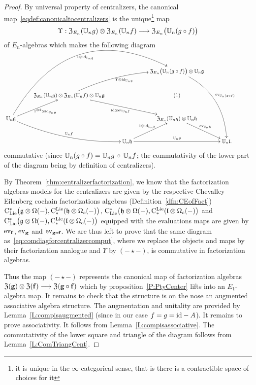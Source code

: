 \documentclass[11pt]{amsart}
\numberwithin{equation}{section}
\begin{document}
\begin{proof}
By universal property of centralizers, the canonical map~\eqref{eqdef:canonicaltocentralizers}  
is the unique\footnote{it is unique in the $\infty$-categorical 
sense, that is there is a contractible space of choices for it} map 
\[ \Upsilon: {\frak Z}_{E_n}(\mathbb U_n g) \otimes {\frak Z}_{E_n}(\mathbb U_n f) \longrightarrow {\frak Z}_{E_n}\big(\mathbb U_n (g\circ f)\big)\] 
of $E_n$-algebras which makes the following diagram
\begin{equation}\label{eq:comdiagforcentralizercomput}\small
 \xymatrix{
&   &&  
{\frak Z}_{E_n}\big(\UU_n (g\circ f) \big) \otimes  \UU_n \fg  \ar@/^{2pc}/[dddr]^{\ev_{\UU_n (g\circ f)}}\\
&{\frak Z}_{E_n}(\UU_n g) \otimes  {\frak Z}_{E_n}(\UU_n f) \otimes \UU_n \fg \ar@/^{1pc}/[rru]_{ \Upsilon \otimes \id_{\UU_n \fg}} \ar[rrd]_{\id\otimes \ev_{\UU_n f}}
&& (1)
& & \\
\UU_n \fg \ar[ur]_{1^{\otimes 2}\otimes \id_{\UU_n \fg}} \ar@/_{1pc}/[rrd]^{\UU_n f} \ar@/^{6pc}/[rrruu]_{1\otimes \id_{\UU_n \fg}} &&&
{\frak Z}_{E_n}(\UU_n g) \otimes \UU_n \fh \ar[rd]^{\ev_{\UU_n h}}  &\\
&& \UU_n \fh \ar[rr]^{\UU_n g} \ar[ur]^{1\otimes \id_{\UU_n \fh}} && \UU_n \fl .}
\end{equation}
commutative (since $\mathbb U_n (g\circ f) = \mathbb U_n g\, \circ \, \mathbb U_n f $;  the commutativity of the lower part of the diagram being by definition of centralizers).

By Theorem~\ref{thm:centralizerfactorization}, we know that the factorization algebras models for the centralizers are given by the respective Chevalley-Eilenberg cochain factorizations algebras 
(Definition~\ref{dfn:CEofFact}) ${\rm C}_{\rm Lie}^*\big(\mathfrak g \otimes \Omega(-), {\rm C}^{\rm Lie}_*(\mathfrak h \otimes \Omega_c(-)  \big) $, 
${\rm C}_{\rm Lie}^*\big(\mathfrak h \otimes \Omega(-), {\rm C}^{\rm Lie}_*(\mathfrak l \otimes \Omega_c(-)  \big) $ and ${\rm C}_{\rm Lie}^*\big(\mathfrak g \otimes \Omega(-), {\rm C}^{\rm Lie}_*(\mathfrak l \otimes \Omega_c(-)  \big) $ 
equipped with the evaluations maps are given by ${\rm ev}_{\mathbf{f}}$, ${\rm ev}_{\mathbf{g}}$ and ${\rm ev}_{\mathbf{g}\circ \mathbf{f}}$. We are thus left 
to prove that the same  diagram as~\eqref{eq:comdiagforcentralizercomput}, where we replace the objects and maps by their factorization analogue and $\Upsilon$
by $(-\star-)$, is commutative in factorization algebras.

Thus the map $(-\star-)$ represents the canonical map of factorization algebras 
$ {\frak Z}(\mathbf{g}) \otimes {\frak Z}(\mathbf{f}) \longrightarrow {\frak Z}(\mathbf{g}\circ \mathbf{f})$ which by proposition~\ref{P:PtyCenter} lifts
into an $E_1$-algebra map. It remains to check that the structure is on the nose an augmented associative algebra structure.
The augmentation and unitality are provided by Lemma~\ref{L:compisaugmented} (since in our case $f=g={\rm id}-A$). 
It remains to prove associativity. It follows from Lemma~\ref{L:compisassociative}. 
The commutativity of the lower square and triangle of the diagram follows from Lemma~\ref{L:ComTriangCent}.
\end{proof}
\end{document}

